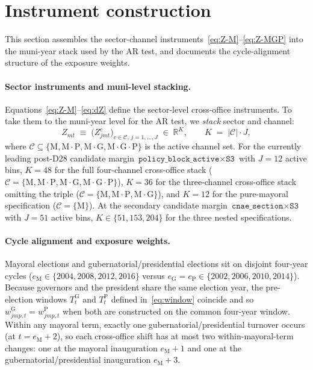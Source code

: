 \documentclass{article}
\theoremstyle{plain}
\theoremstyle{definition}
\theoremstyle{remark}
\begin{document}
\section{Instrument construction}\label{sec:instrument}

This section assembles the sector-channel
instruments~\eqref{eq:Z-M}--\eqref{eq:Z-MGP} into the muni-year stack
used by the AR test, and documents the cycle-alignment structure of
the exposure weights.

\paragraph{Sector instruments and muni-level stacking.}
Equations~\eqref{eq:Z-M}--\eqref{eq:dZ} define the sector-level cross-office
instruments. To take them to the muni-year level for the AR test, we
\emph{stack} sector and channel:
\begin{equation}\label{eq:stacked}
  Z_{mt}
  \;\equiv\;
  \big( Z^{c}_{jmt} \big)_{c\in\mathcal{C},\,j=1,\dots,J}
  \;\in\;\mathbb{R}^{K},
  \qquad
  K \;=\; |\mathcal{C}|\cdot J,
\end{equation}
where $\mathcal{C}\subseteq\{\mathrm{M},\mathrm{M{\cdot}P},
\mathrm{M{\cdot}G},\mathrm{M{\cdot}G{\cdot}P}\}$ is the active channel
set. For the currently leading post-D28 candidate margin
$\texttt{policy\_block\_active}\times\texttt{S3}$ with $J=12$ active bins,
$K=48$ for the full four-channel cross-office stack
($\mathcal{C}=\{\mathrm{M},\mathrm{M{\cdot}P},\mathrm{M{\cdot}G},
\mathrm{M{\cdot}G{\cdot}P}\}$), $K=36$ for the three-channel cross-office
stack omitting the triple ($\mathcal{C}=\{\mathrm{M},\mathrm{M{\cdot}P},
\mathrm{M{\cdot}G}\}$), and $K=12$ for the pure-mayoral specification
($\mathcal{C}=\{\mathrm{M}\}$). At the secondary candidate margin
$\texttt{cnae\_section}\times\texttt{S3}$ with $J=51$ active bins,
$K\in\{51,153,204\}$ for the three nested specifications.

\paragraph{Cycle alignment and exposure weights.}
Mayoral elections and gubernatorial/presidential elections sit on
disjoint four-year cycles ($e_{\mathrm{M}}\in\{2004,2008,2012,2016\}$
versus $e_{\mathrm{G}}=e_{\mathrm{P}}\in\{2002,2006,2010,2014\}$).
Because governors and the president share the same election year, the
pre-election windows $T^{\mathrm{G}}_{t}$ and $T^{\mathrm{P}}_{t}$
defined in~\eqref{eq:window} coincide and so $w^{\mathrm{G}}_{jmp,t}
=w^{\mathrm{P}}_{jmp,t}$ when both are constructed on the common
four-year window. Within any mayoral term, exactly one
gubernatorial/presidential turnover occurs (at $t=e_{\mathrm{M}}+2$), so
each cross-office shift has at most two within-mayoral-term changes: one at
the mayoral inauguration $e_{\mathrm{M}}+1$ and one at the
gubernatorial/presidential inauguration $e_{\mathrm{M}}+3$.
\end{document}
